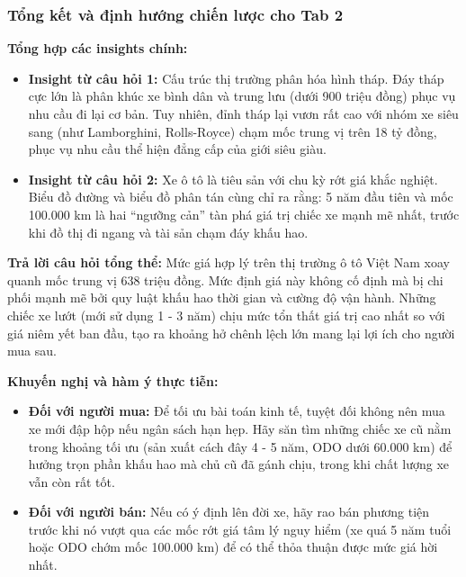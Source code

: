 
\subsubsection{Tổng kết và định hướng chiến lược cho Tab 2}
\label{subsubsec:tab2_summary}

\noindent\textbf{Tổng hợp các insights chính:}
\begin{itemize}
    \item \textbf{Insight từ câu hỏi 1:} Cấu trúc thị trường phân hóa hình tháp. Đáy tháp cực lớn là phân khúc xe bình dân và trung lưu (dưới 900 triệu đồng) phục vụ nhu cầu đi lại cơ bản. Tuy nhiên, đỉnh tháp lại vươn rất cao với nhóm xe siêu sang (như Lamborghini, Rolls-Royce) chạm mốc trung vị trên 18 tỷ đồng, phục vụ nhu cầu thể hiện đẳng cấp của giới siêu giàu.
    \item \textbf{Insight từ câu hỏi 2:} Xe ô tô là tiêu sản với chu kỳ rớt giá khắc nghiệt. Biểu đồ đường và biểu đồ phân tán cùng chỉ ra rằng: 5 năm đầu tiên và mốc 100.000 km là hai ``ngưỡng cản'' tàn phá giá trị chiếc xe mạnh mẽ nhất, trước khi đồ thị đi ngang và tài sản chạm đáy khấu hao.
\end{itemize}

\noindent\textbf{Trả lời câu hỏi tổng thể:} 
Mức giá hợp lý trên thị trường ô tô Việt Nam xoay quanh mốc trung vị 638 triệu đồng. Mức định giá này không cố định mà bị chi phối mạnh mẽ bởi quy luật khấu hao thời gian và cường độ vận hành. Những chiếc xe lướt (mới sử dụng 1 - 3 năm) chịu mức tổn thất giá trị cao nhất so với giá niêm yết ban đầu, tạo ra khoảng hở chênh lệch lớn mang lại lợi ích cho người mua sau.

\noindent\textbf{Khuyến nghị và hàm ý thực tiễn:}
\begin{itemize}
    \item \textbf{Đối với người mua:} 
    Để tối ưu bài toán kinh tế, tuyệt đối không nên mua xe mới đập hộp nếu ngân sách hạn hẹp. Hãy săn tìm những chiếc xe cũ nằm trong khoảng tối ưu (sản xuất cách đây 4 - 5 năm, ODO dưới 60.000 km) để hưởng trọn phần khấu hao mà chủ cũ đã gánh chịu, trong khi chất lượng xe vẫn còn rất tốt.
    \item \textbf{Đối với người bán:} 
    Nếu có ý định lên đời xe, hãy rao bán phương tiện trước khi nó vượt qua các mốc rớt giá tâm lý nguy hiểm (xe quá 5 năm tuổi hoặc ODO chớm mốc 100.000 km) để có thể thỏa thuận được mức giá hời nhất.
\end{itemize}





